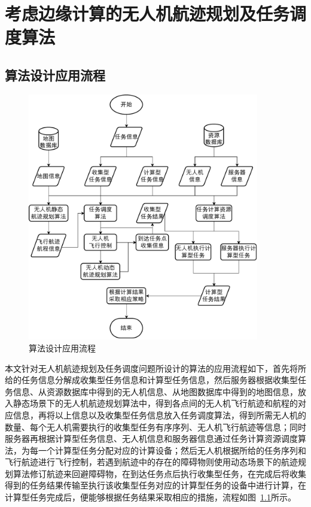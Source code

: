 \chapter{考虑边缘计算的无人机航迹规划及任务调度算法}

\section{算法设计应用流程}

\begin{figure}[!htbp]
    \centering
    \includegraphics[width=0.9\textwidth]{images/算法设计应用流程.pdf}
    \caption{算法设计应用流程}
    \label{fig:算法设计应用流程}
\end{figure}

本文针对无人机航迹规划及任务调度问题所设计的算法的应用流程如下，首先将所给的任务信息分解成收集型任务信息和计算型任务信息，然后服务器根据收集型任务信息、从资源数据库中得到的无人机信息、从地图数据库中得到的地图信息，放入静态场景下的无人机航迹规划算法中，得到各点间的无人机飞行航迹和航程的对应信息，再将以上信息以及收集型任务信息放入任务调度算法，得到所需无人机的数量、每个无人机需要执行的收集型任务有序序列、无人机飞行航迹等信息；同时服务器再根据计算型任务信息、无人机信息和服务器信息通过任务计算资源调度算法，为每一个计算型任务分配对应的计算设备；然后无人机根据所给的任务序列和飞行航迹进行飞行控制，若遇到航迹中的存在的障碍物则使用动态场景下的航迹规划算法修订航迹来回避障碍物，在到达任务点后执行收集型任务，在完成后将收集得到的任务结果传输至执行该收集型任务对应的计算型任务的设备中进行计算，在计算型任务完成后，便能够根据任务结果采取相应的措施，流程如图~\ref{fig:算法设计应用流程}所示。

